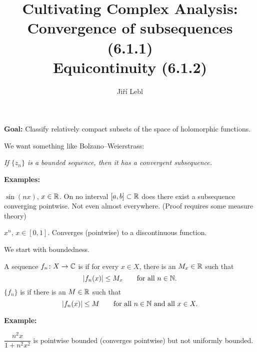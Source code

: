 \documentclass[10pt,aspectratio=169]{beamer}
\author{Ji\v{r}\'i Lebl}
\institute[OSU]{%
Departemento pri Matematiko de Oklahoma {\^S}tata Universitato}
\title{Cultivating Complex Analysis:\\%
Convergence of subsequences (6.1.1)\\%
Equicontinuity (6.1.2)}
\date{}
\begin{document}
\begin{frame}
\titlepage
\end{frame}

\begin{frame}
\textbf{Goal:} Classify relatively compact subsets of the space of holomorphic
functions.

\medskip
\pause

We want something like Bolzano--Weierstrass:

\emph{If $\{ z_n \}$ is a
bounded sequence, then it has a convergent subsequence.}

\bigskip
\pause

\textbf{Examples:}

\medskip

$\sin(nx)$, \enspace $x \in {\mathbb{R}}$. \pause
On no interval $[a,b] \subset {\mathbb{R}}$ does there exist
a subsequence converging pointwise.  Not even almost everywhere.
\pause
(Proof requires some measure theory)

\medskip
\pause

$x^n$, \enspace $x \in [0,1]$. \pause
Converges (pointwise) to a discontinuous function.

\end{frame}

\begin{frame}
We start with boundedness.

\pause

\begin{definition}
A sequence $f_n \colon X \to {\mathbb{C}}$
is \emph{} if for every $x \in X$, there is an $M_x \in {\mathbb{R}}$
such that
\begin{equation*}
\lvert {f_n(x)} \rvert \leq M_x \qquad \text{for all } n \in {\mathbb{N}} .
\end{equation*}
\pause
$\{ f_n \}$
is \emph{} if there is an $M \in {\mathbb{R}}$
such that
\begin{equation*}
\lvert {f_n(x)} \rvert \leq M \qquad \text{for all } n \in {\mathbb{N}} \text{ and all } x \in X.
\end{equation*}
\end{definition}

\medskip
\pause

\textbf{Example:}

$\dfrac{n^2x}{1+n^2x^2}$ is pointwise bounded (converges pointwise)
but not uniformly bounded.


\end{frame}
\end{document}
